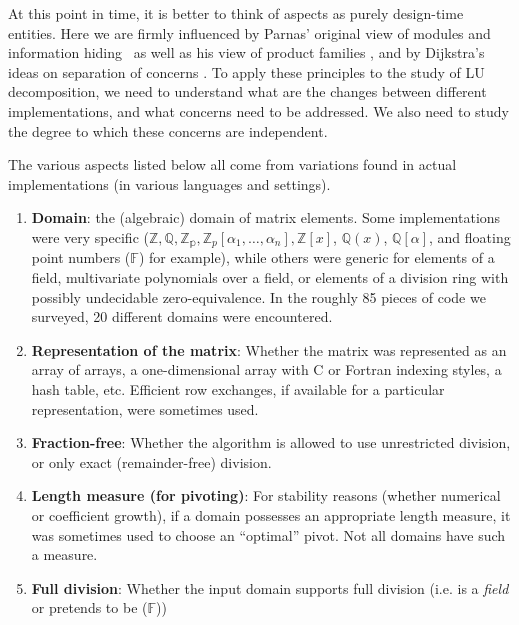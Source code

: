 \documentclass{elsart}
\newcommand{\floats}{\mathbb{F}}
\begin{document}
At this point in time, it is better to think of aspects as purely
design-time entities.  Here we are firmly influenced by Parnas' original
view of modules and information hiding~\cite{journals/cacm/parnas72a} as well
as his view of product families \cite{journals/tse/Parnas76}, and by
Dijkstra's ideas on separation of concerns \cite{EWD:EWD447}.
To apply these principles to the study of LU decomposition, we need
to understand what are the changes between different implementations, and 
what concerns need to be addressed.  We also need to study the degree
to which these concerns are independent.

The various aspects listed below all come from variations found in actual
implementations (in various languages and settings).

\begin{enumerate}
    \item \textbf{Domain}: the (algebraic) domain of matrix
        elements.  Some implementations were very specific
        ($\mathbb{Z}, \mathbb{Q}, \mathbb{Z_p}, 
        \mathbb{Z}_p\left[\alpha_1,\ldots,\alpha_n\right], 
        \mathbb{Z}\left[x\right]$, $\mathbb{Q}\left(x\right)$, 
        $\mathbb{Q}\left[\alpha\right]$, and floating point numbers 
        ($\floats$) for 
        example), while others were generic for elements of a field,
        multivariate polynomials over a field, or elements of a division ring
        with possibly undecidable zero-equivalence.  In the roughly 85 pieces
        of code we surveyed, 20 different domains were encountered.
    \item \textbf{Representation of the matrix}: Whether the matrix
        was represented as an array of arrays, a
        one-dimensional array with C or Fortran indexing styles, 
        a hash table, etc. Efficient row exchanges, if available for a
        particular representation, were sometimes used.
    \item \textbf{Fraction-free}: Whether the 
        algorithm is allowed to use unrestricted division, or only
        exact (remainder-free) division.
    \item \textbf{Length measure (for pivoting)}:  For stability reasons
        (whether numerical or coefficient growth), if a domain 
        possesses an appropriate length measure, it was sometimes used to
        choose an ``optimal'' pivot.  Not all domains have such a measure.
    \item \textbf{Full division}: Whether the input domain supports full
        division (i.e. is a \emph{field} or pretends to be ($\floats$)) 

\end{enumerate}
\end{document}
